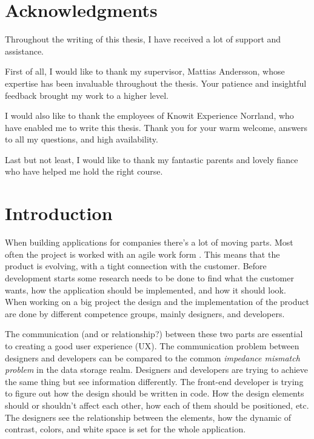 \section{Acknowledgments}
Throughout the writing of this thesis, I have received a lot of support and assistance.

First of all, I would like to thank my supervisor, Mattias Andersson, whose expertise has been invaluable throughout the thesis. Your patience and insightful feedback brought my work to a higher level.

I would also like to thank the employees of Knowit Experience Norrland, who have enabled me to write this thesis. Thank you for your warm welcome, answers to all my questions, and high availability.

Last but not least, I would like to thank my fantastic parents and lovely fiance who have helped me hold the right course.

\section{Introduction}




When building applications for companies there's a lot of moving parts. Most often the project is worked with an agile work form \cite{cohen2004introduction}. This means that the product is evolving, with a tight connection with the customer. Before development starts some research needs to be done to find what the customer wants, how the application should be implemented, and how it should look. When working on a big project the design and the implementation of the product are done by different competence groups, mainly designers, and developers. 

The communication (and or relationship?) between these two parts are essential to creating a good user experience (UX). The communication problem between designers and developers can be compared to the common \textit{impedance mismatch problem} in the data storage realm. Designers and developers are trying to achieve the same thing but see information differently. The front-end developer is trying to figure out how the design should be written in code. How the design elements should or shouldn't affect each other, how each of them should be positioned, etc. The designers see the relationship between the elements, how the dynamic of contrast, colors, and white space is set for the whole application. 

